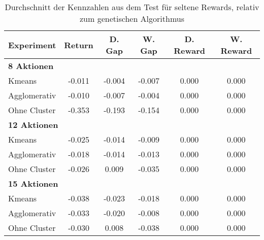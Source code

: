 \begin{table}[ht]
\centering
\begin{tabular}{lccccc}
\hline
\textbf{Experiment} & \textbf{Return} & \textbf{D. Gap} & \textbf{W. Gap} & \textbf{D. Reward} & \textbf{W. Reward} \\
\hline
\multicolumn{6}{l}{\textbf{8 Aktionen}} \\
\hspace{1em}Kmeans & -0.011 & -0.004 & -0.007 & 0.000 & 0.000 \\
\hspace{1em}Agglomerativ & -0.010 & -0.007 & -0.004 & 0.000 & 0.000 \\
\hspace{1em}Ohne Cluster & -0.353 & -0.193 & -0.154 & 0.000 & 0.000 \\
\hline
\multicolumn{6}{l}{\textbf{12 Aktionen}} \\
\hspace{1em}Kmeans & -0.025 & -0.014 & -0.009 & 0.000 & 0.000 \\
\hspace{1em}Agglomerativ & -0.018 & -0.014 & -0.013 & 0.000 & 0.000 \\
\hspace{1em}Ohne Cluster & -0.026 & 0.009 & -0.035 & 0.000 & 0.000 \\
\hline
\multicolumn{6}{l}{\textbf{15 Aktionen}} \\
\hspace{1em}Kmeans & -0.038 & -0.023 & -0.018 & 0.000 & 0.000 \\
\hspace{1em}Agglomerativ & -0.033 & -0.020 & -0.008 & 0.000 & 0.000 \\
\hspace{1em}Ohne Cluster & -0.030 & 0.008 & -0.038 & 0.000 & 0.000 \\
\hline
\end{tabular}
\caption{Durchschnitt der Kennzahlen aus dem Test für seltene Rewards, relativ zum genetischen Algorithmus}
\end{table}


